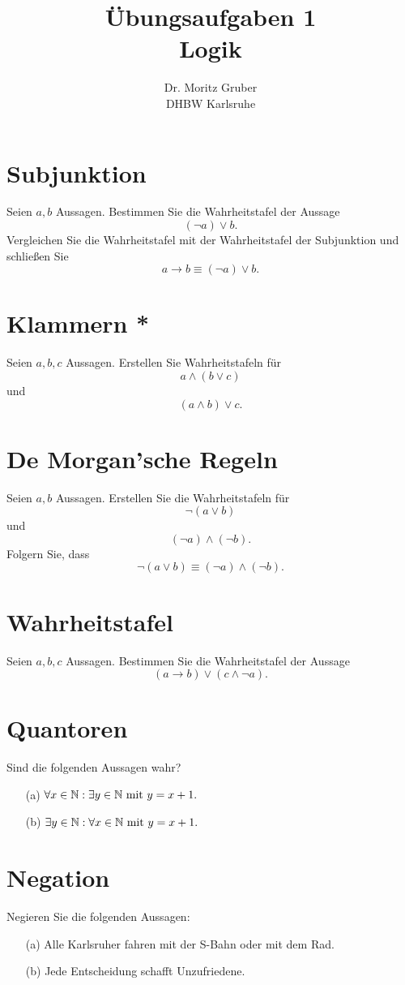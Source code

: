 \documentclass[
				a4paper,
				10pt
			]
			{scrartcl}
\author{Dr. Moritz Gruber\\ DHBW Karlsruhe}
\title{ \"Ubungsaufgaben 1\\
	 Logik
}
\date{}
\begin{document}
\maketitle

\section{Subjunktion}
Seien $a,b$  Aussagen. 
Bestimmen Sie die Wahrheitstafel der Aussage
$$
	(\neg a) \lor b.
$$
Vergleichen Sie die Wahrheitstafel mit der Wahrheitstafel der Subjunktion und schlie{\ss}en Sie
$$
	a \rightarrow b \equiv (\neg a) \lor b.
$$


\section{Klammern *}
Seien $a,b,c$  Aussagen.
Erstellen Sie Wahrheitstafeln f\"ur 
$$
	a\land (b \lor c)
$$
und
$$
	(a\land b) \lor c.
$$

\section{De Morgan'sche Regeln}
Seien $a,b$ Aussagen.
Erstellen Sie die Wahrheitstafeln f\"ur
$$
	\neg (a \lor b)
$$
und
$$
	(\neg a) \land (\neg b). 
$$
Folgern Sie, dass
$$
	\neg (a \lor b) \equiv (\neg a) \land (\neg b). 
$$


\section{Wahrheitstafel}
Seien $a,b,c$ Aussagen. 
Bestimmen Sie die Wahrheitstafel der Aussage
$$
	(a \rightarrow b) \lor (c \land \neg a).
$$

\section{Quantoren}
Sind die folgenden Aussagen wahr?
\begin{itemize}
	\item[(a)] $\forall x\in \mathbb{N}: \exists y\in \mathbb{N} \text{~mit~} y = x+1.$
	\item[(b)] $\exists y\in \mathbb{N}: \forall x\in \mathbb{N} \text{~mit~} y = x+1.$
\end{itemize}

\section{Negation}
 Negieren Sie die folgenden Aussagen:
 \begin{itemize}
	\item[(a)] Alle Karlsruher fahren mit der S-Bahn oder mit dem Rad.
 	\item[(b)] Jede Entscheidung schafft Unzufriedene.
 \end{itemize}
 
\end{document}

